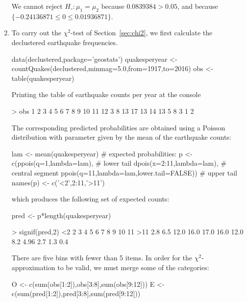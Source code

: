 \begin{enumerate}
We cannot reject $H_\circ: \mu_1=\mu_2$ because $0.0839384>0.05$, and
because $\{-0.24136871\leq{0}\leq{0.01936871}\}$.

\item To carry out the $\chi^2$-test of Section~\ref{sec:chi2}, we
  first calculate the declustered earthquake frequencies.

\begin{script}
data(declustered,package='geostats')
quakesperyear <- countQuakes(declustered,minmag=5.0,from=1917,to=2016)
obs <- table(quakesperyear)
\end{script}

Printing the table of earthquake counts per year at the console

\begin{console}
> obs
 1  2  3  4  5  6  7  8  9 10 11 12 
 3  8 13 17 13 14 13  5  8  3  1  2 
\end{console}

The corresponding predicted probabilities are obtained using a Poisson
distribution with parameter given by the mean of the earthquake
counts:

\begin{script}[firstnumber=4]
lam <- mean(quakesperyear)
# expected probabilities:
p <- c(ppois(q=1,lambda=lam),                   # lower tail
       dpois(x=2:11,lambda=lam),                # central segment
       ppois(q=11,lambda=lam,lower.tail=FALSE)) # upper tail
names(p) <- c('<2',2:11,'>11')
\end{script}

\noindent which produces the following set of expected counts:

\begin{script}[firstnumber=10]
pred <- p*length(quakesperyear)       
\end{script}

\begin{console}
> signif(pred,2)
  <2    2    3    4    5    6    7    8     9   10   11  >11 
 2.8  6.5 12.0 16.0 17.0 16.0 12.0  8.2  4.96  2.7  1.3  0.4
\end{console}

There are five bins with fewer than 5 items. In order for the
$\chi^2$-approximation to be valid, we must merge some of the
categories:

\begin{script}[firstnumber=11]
O <- c(sum(obs[1:2]),obs[3:8],sum(obs[9:12]))
E <- c(sum(pred[1:2]),pred[3:8],sum(pred[9:12]))
\end{script}


\end{enumerate}
